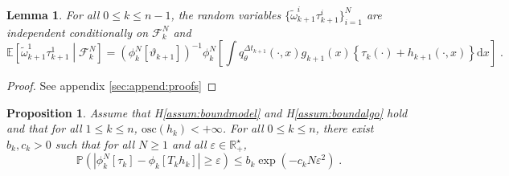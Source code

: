 \documentclass[12pt]{article}
\newcommand{\rmd}{\mathrm{d}}
\newcommand{\eqsp}{\;}
\newcommand{\1}{\mathrm{1}}
\newtheorem{lemma}{Lemma}
\newtheorem{proposition}{Proposition}
\begin{document}
\begin{lemma}
\label{lem:iid}
For all $0\le k \le n-1$, the random variables $\{\widetilde{\omega}_{k+1}^i\tau_{k+1}^i\}_{i=1}^N$ are independent conditionally on $\mathcal{F}_k^{N}$ and%
\[
\mathbb{E}\left[\tilde{\omega}^1_{k+1}\tau^{1}_{k+1}\middle| \mathcal{F}_k^{N}\right] = \left(\phi^N_{k}[\vartheta_{k+1}]\right)^{-1}\phi^N_{k}\left[\int q_{\theta}^{\Delta t_{k+1}}(\cdot,x)g_{k+1}(x)\left\{\tau_k(\cdot) + h_{k+1}(\cdot,x)\right\}\rmd x\right]\eqsp.
\]
\end{lemma}

\begin{proof}
See appendix \ref{sec:append:proofs}
\end{proof}

\begin{proposition}
Assume that H\ref{assum:boundmodel} and H\ref{assum:boundalgo} hold and that for all $1\le k\le n$, $\mathrm{osc}(h_k)<+\infty$. For all $0\le k\le n$, there exist $b_k,c_k>0$ such that for all $N\ge 1$ and all $\varepsilon\in\mathbb{R}_+^\star$,
\[
\mathbb{P}\left(\left|\phi_k^N[\tau_k] - \phi_k\left[T_kh_k\right]\right|\ge \varepsilon\right)\le b_k\exp\left(-c_kN\varepsilon^2\right)\eqsp.
\]
\end{proposition}
\end{document}
